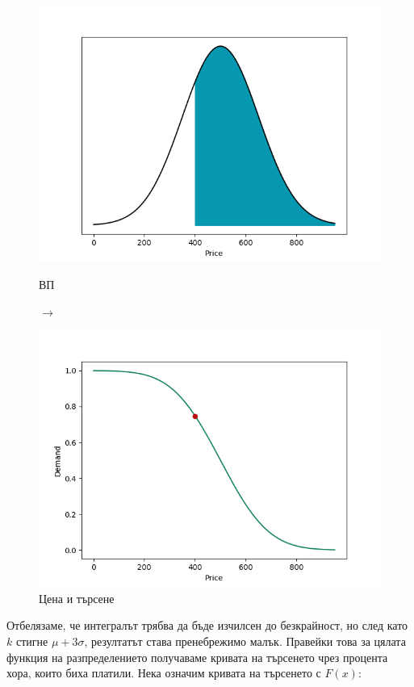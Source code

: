 \documentclass[11pt, a4paper]{article}
\theoremstyle{definition}
\begin{document}
			\begin{figure}[H]
				\begin{minipage}{0.48\textwidth}
					\centering
					\includegraphics[width=\linewidth]{ND_integral}
					\caption{ВП}\label{Fig:Data1}
				\end{minipage}$\longrightarrow$
				\begin{minipage}{0.48\textwidth}
					\centering
					\includegraphics[width=\linewidth]{Sample_point}
					\caption{Цена и търсене}\label{Fig:Data2}
				\end{minipage}
			\end{figure}\par\noindent
			Отбелязаме, че интегралът трябва да бъде изчилсен до безкрайност, но след като $k$ стигне $\mu+3\sigma$, резултатът става пренебрежимо малък. Правейки това за цялата функция на разпределението получаваме кривата на търсенето чрез процента хора, които биха платили. Нека означим кривата на търсенето с $F(x)$:
\end{document}

